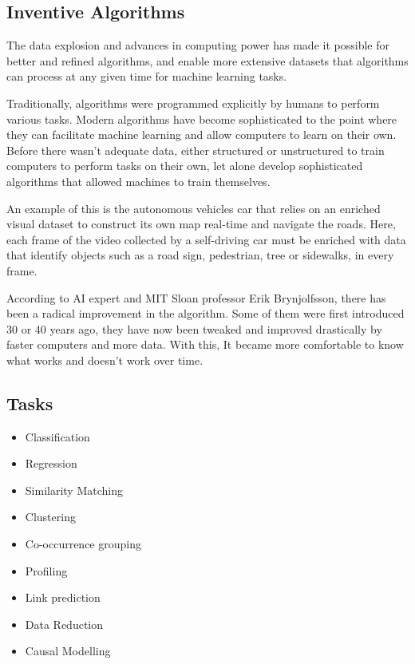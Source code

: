 \subsection{Inventive Algorithms}
The data explosion and advances in computing power has made it possible for better and refined algorithms, and enable more extensive datasets that algorithms can process at any given time for machine learning tasks. 

Traditionally, algorithms were programmed explicitly by humans to perform various tasks. Modern algorithms have become sophisticated to the point where they can facilitate machine learning and allow computers to learn on their own. Before there wasn’t adequate data, either structured or unstructured to train computers to perform tasks on their own, let alone develop sophisticated algorithms that allowed machines to train themselves. 

An example of this is the autonomous vehicles car that relies on an enriched visual dataset to construct its own map real-time and navigate the roads. Here, each frame of the video collected by a self-driving car must be enriched with data that identify objects such as a road sign, pedestrian, tree or sidewalks, in every frame.

According to AI expert and MIT Sloan professor Erik Brynjolfsson, there has been a radical improvement in the algorithm. Some of them were first introduced 30 or 40 years ago, they have now been tweaked and improved drastically by faster computers and more data. With this, It became more comfortable to know what works and doesn't work over time.

\subsection{Tasks}
\begin{itemize}
\item Classification
\item Regression
\item Similarity Matching
\item Clustering
\item Co-occurrence grouping
\item Profiling
\item Link prediction
\item Data Reduction
\item Causal Modelling
\end{itemize}


